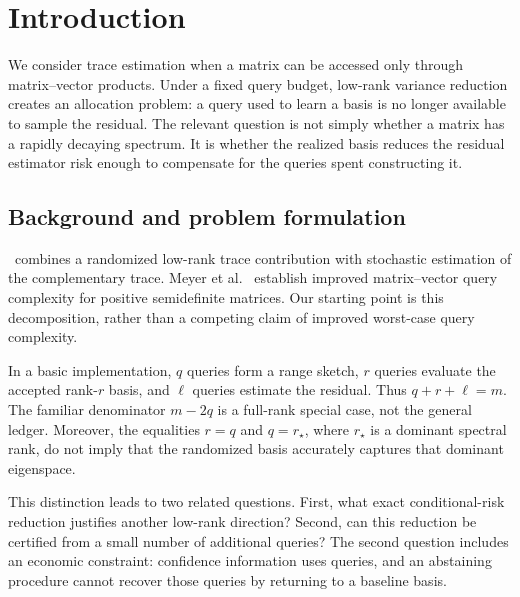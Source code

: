 \section{Introduction}\label{sec:introduction}
We consider trace estimation when a matrix can be accessed only through
matrix--vector products. Under a fixed query budget, low-rank variance
reduction creates an allocation problem: a query used to learn a basis is
no longer available to sample the residual. The relevant question is not
simply whether a matrix has a rapidly decaying spectrum. It is whether the
realized basis reduces the residual estimator risk enough to compensate for
the queries spent constructing it.

\subsection{Background and problem formulation}
\hutchpp\ combines a randomized low-rank trace contribution with stochastic
estimation of the complementary trace. Meyer et al.~\cite{meyer2021}
establish improved matrix--vector query complexity for positive semidefinite
matrices. Our starting point is this decomposition, rather than a competing
claim of improved worst-case query complexity.

In a basic implementation, $q$ queries form a range sketch, $r$ queries
evaluate the accepted rank-$r$ basis, and $\ell$ queries estimate the residual.
Thus $q+r+\ell=m$. The familiar denominator $m-2q$ is a full-rank special
case, not the general ledger. Moreover, the equalities $r=q$ and
$q=r_\star$, where $r_\star$ is a dominant spectral rank, do not imply that the
randomized basis accurately captures that dominant eigenspace.

This distinction leads to two related questions. First, what exact
conditional-risk reduction justifies another low-rank direction? Second,
can this reduction be certified from a small number of additional queries?
The second question includes an economic constraint: confidence information
uses queries, and an abstaining procedure cannot recover those queries by
returning to a baseline basis.

